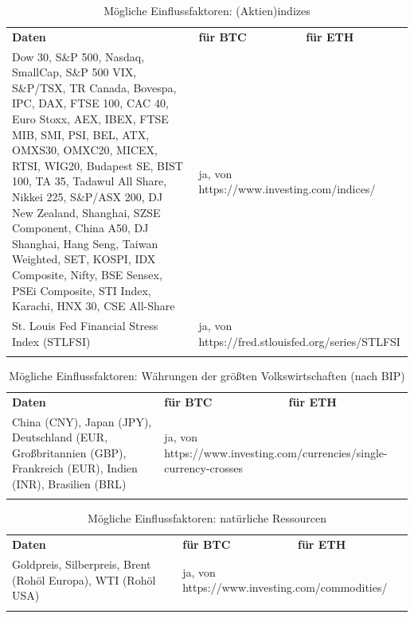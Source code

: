 \begin{centering} \begin{longtable}[H]{|p{9cm}|p{}|p{}|}
\hline
\textbf{Daten} & \textbf{für BTC} & \textbf{für ETH} \\
\hhline{===}
Dow 30, S\&P 500, Nasdaq, SmallCap, S\&P 500 VIX, S\&P/TSX, TR Canada, Bovespa, IPC, DAX, FTSE 100, CAC 40, Euro Stoxx, AEX, IBEX, FTSE MIB, SMI, PSI, BEL, ATX, OMXS30, OMXC20, MICEX, RTSI, WIG20, Budapest SE, BIST 100, TA 35, Tadawul All Share, Nikkei 225, S\&P/ASX 200, DJ New Zealand, Shanghai, SZSE Component, China A50, DJ Shanghai, Hang Seng, Taiwan Weighted, SET, KOSPI, IDX Composite, Nifty, BSE Sensex, PSEi Composite, STI Index, Karachi, HNX 30, CSE All-Share	& \multicolumn{2}{p{7cm}|}{ja, von https://www.investing.com/indices/}\\ \hline
St. Louis Fed Financial Stress Index (STLFSI) & \multicolumn{2}{p{7cm}|}{ja, von https://fred.stlouisfed.org/series/STLFSI}\\ \hline
\caption{Mögliche Einflussfaktoren: (Aktien)indizes}
\end{longtable} 
\end{centering}

\begin{centering} \begin{longtable}[H]{|p{7cm}|p{}|p{}|}
\hline
\textbf{Daten} & \textbf{für BTC} & \textbf{für ETH} \\
\hhline{===}
China (CNY), Japan (JPY), Deutschland (EUR, Großbritannien  (GBP), Frankreich (EUR), Indien (INR), Brasilien (BRL) & \multicolumn{2}{p{9cm}|}{ja, von https://www.investing.com/currencies/single-currency-crosses}\\ \hline
\caption{Mögliche Einflussfaktoren: Währungen der größten Volkswirtschaften (nach BIP)}
\end{longtable} 
\end{centering}

\begin{centering} \begin{longtable}[H]{|p{7cm}|p{}|p{}|}
\hline
\textbf{Daten} & \textbf{für BTC} & \textbf{für ETH} \\
\hhline{===}
Goldpreis, Silberpreis, Brent (Rohöl Europa), WTI (Rohöl USA) & \multicolumn{2}{p{9cm}|}{ja, von https://www.investing.com/commodities/}\\ \hline
\caption{Mögliche Einflussfaktoren: natürliche Ressourcen}
\label{tab:dataToAnalyseE}
\end{longtable} \end{centering}

